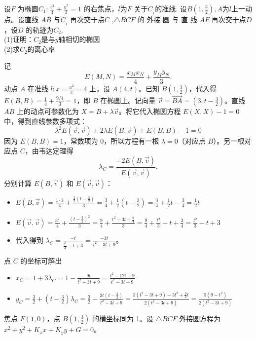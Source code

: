 \begin{exercise}[轨迹问题]
设$F$ 为椭圆$C_1:\frac{x^2}4+\frac{y^2}3=1$ 的右焦点，$l$为$F$ 关于$C_{_1}$的准线. 设$B(1,\frac32),A$为$l$上一动点。设直线 $AB$ 与$C_{_1}$ 再次交于点$C$ ,$\triangle BCF$ 的 外接 圆 与 直 线 $AF$ 再次交于点$D$，设$D$ 的轨迹为$C_2$.\\
(1)证明：$C_2$是与$y$轴相切的椭圆\\
(2)求$C_2$的离心率
\end{exercise}
\begin{solution}
记
\[
E(M, N) = \frac{x_M x_N}{4} + \frac{y_M y_N}{3}.
\]
动点 $A$ 在准线 $l: x = \frac{a^2}{c} = 4$ 上，设 $A(4, t)$。已知 $B(1, \frac{3}{2})$，代入得 $E(B,B) = \frac{1}{4} + \frac{9/4}{3} = 1$，即 $B$ 在椭圆上。记向量 $\vec{v} = \overrightarrow{BA} = (3, t - \frac{3}{2})$。直线 $AB$ 上的动点可参数化为 $X = B + \lambda \vec{v}$。将它代入椭圆方程 $E(X,X) - 1 = 0$ 中，得到直线参数多项式：
$$\lambda^2 E(\vec{v}, \vec{v}) + 2\lambda E(B, \vec{v}) + E(B,B) - 1 = 0$$
因为 $E(B,B) = 1$，常数项为 $0$，所以方程有一根 $\lambda = 0$（对应点 $B$）。另一根对应点 $C$，由韦达定理得
$$\lambda_C = \frac{-2E(B, \vec{v})}{E(\vec{v}, \vec{v})}.$$
分别计算 $E(B,\vec v)$ 和 $E(\vec v,\vec v)$：
\begin{itemize}
\item $E(B, \vec{v}) = \frac{1 \cdot 3}{4} + \frac{\frac{3}{2}(t - \frac{3}{2})}{3} = \frac{3}{4} + \frac{1}{2}(t - \frac{3}{2}) = \frac{3}{4} + \frac{1}{2}t - \frac{3}{4} = {\frac{1}{2}t}$
\item $E(\vec{v}, \vec{v}) = \frac{3^2}{4} + \frac{(t - \frac{3}{2})^2}{3} = \frac{9}{4} + \frac{t^2 - 3t + \frac{9}{4}}{3} = \frac{9}{4} + \frac{t^2}{3} - t + \frac{3}{4} = {\frac{t^2}{3} - t + 3}$
\item 代入得到 $\lambda_C = \frac{-t}{\frac{t^2}{3} - t + 3} = \frac{-3t}{t^2 - 3t + 9}$。
\end{itemize}
点 $C$ 的坐标可解出
\begin{itemize}
\item $x_C = 1 + 3\lambda_C = 1 - \frac{9t}{t^2 - 3t + 9} ={\frac{t^2 - 12t + 9}{t^2 - 3t + 9}}$
\item $y_C = \frac{3}{2} + (t - \frac{3}{2})\lambda_C = \frac{3}{2} - \frac{3t(t - \frac{3}{2})}{t^2 - 3t + 9} = \frac{3(t^2 - 3t + 9) - 3t^2 + \frac{9}{2}t}{2(t^2 - 3t + 9)} ={\frac{3(9 - t^2)}{2(t^2 - 3t + 9)}}$
\end{itemize}
焦点 $F(1,0)$，点 $B(1, \frac{3}{2})$ 的横坐标同为 1。设 $\triangle BCF$ 外接圆方程为 $x^2 + y^2 + K_x x + K_y y + G = 0$。
\begin{itemize}

\end{itemize}
\end{solution}
